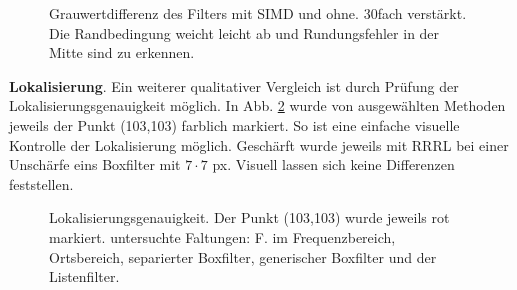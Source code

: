 \documentclass[a4paper,12pt]{article}
\begin{document}
\begin{figure}[htbp]
\caption{Grauwertdifferenz des Filters mit SIMD und ohne. 30fach verstärkt. Die
Randbedingung weicht leicht ab und Rundungsfehler in der Mitte sind zu erkennen. }%
\label{figure_hist_simd}
\end{figure}

\textbf{Lokalisierung}. Ein weiterer qualitativer Vergleich ist durch Prüfung
der Lokalisierungs\-genauigkeit möglich. In Abb. \ref{figure_lokalisierung}
wurde von ausgewählten Methoden jeweils der Punkt (103,103) farblich markiert. 
So ist eine einfache visuelle
Kontrolle der Lokalisierung möglich. Geschärft wurde jeweils mit RRRL bei einer
Unschärfe eins Boxfilter mit $7 \cdot 7$ px. Visuell lassen sich keine
Differenzen feststellen.

\begin{figure}[htbp]
\caption{Lokalisierungsgenauigkeit. Der Punkt (103,103) wurde jeweils rot
markiert. untersuchte Faltungen: F. im Frequenzbereich, Ortsbereich,
separierter Boxfilter, generischer Boxfilter und der Listenfilter.}%
\label{figure_lokalisierung}
\end{figure}
\end{document}
